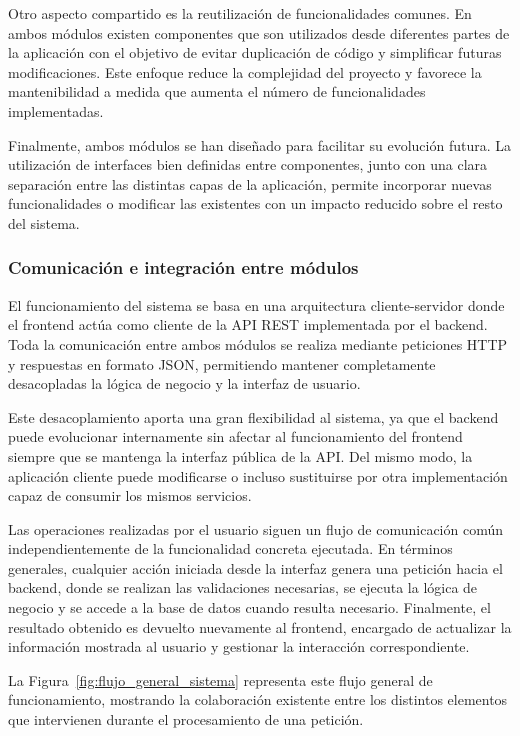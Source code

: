 Otro aspecto compartido es la reutilización de funcionalidades comunes. En ambos módulos existen componentes que son utilizados desde diferentes partes de la aplicación con el objetivo de evitar duplicación de código y simplificar futuras modificaciones. Este enfoque reduce la complejidad del proyecto y favorece la mantenibilidad a medida que aumenta el número de funcionalidades implementadas.

Finalmente, ambos módulos se han diseñado para facilitar su evolución futura. La utilización de interfaces bien definidas entre componentes, junto con una clara separación entre las distintas capas de la aplicación, permite incorporar nuevas funcionalidades o modificar las existentes con un impacto reducido sobre el resto del sistema.

\subsubsection{Comunicación e integración entre módulos}

El funcionamiento del sistema se basa en una arquitectura cliente-servidor donde el frontend actúa como cliente de la API REST implementada por el backend. Toda la comunicación entre ambos módulos se realiza mediante peticiones HTTP y respuestas en formato JSON, permitiendo mantener completamente desacopladas la lógica de negocio y la interfaz de usuario.

Este desacoplamiento aporta una gran flexibilidad al sistema, ya que el backend puede evolucionar internamente sin afectar al funcionamiento del frontend siempre que se mantenga la interfaz pública de la API. Del mismo modo, la aplicación cliente puede modificarse o incluso sustituirse por otra implementación capaz de consumir los mismos servicios.

Las operaciones realizadas por el usuario siguen un flujo de comunicación común independientemente de la funcionalidad concreta ejecutada. En términos generales, cualquier acción iniciada desde la interfaz genera una petición hacia el backend, donde se realizan las validaciones necesarias, se ejecuta la lógica de negocio y se accede a la base de datos cuando resulta necesario. Finalmente, el resultado obtenido es devuelto nuevamente al frontend, encargado de actualizar la información mostrada al usuario y gestionar la interacción correspondiente.

La Figura~\ref{fig:flujo_general_sistema} representa este flujo general de funcionamiento, mostrando la colaboración existente entre los distintos elementos que intervienen durante el procesamiento de una petición.

